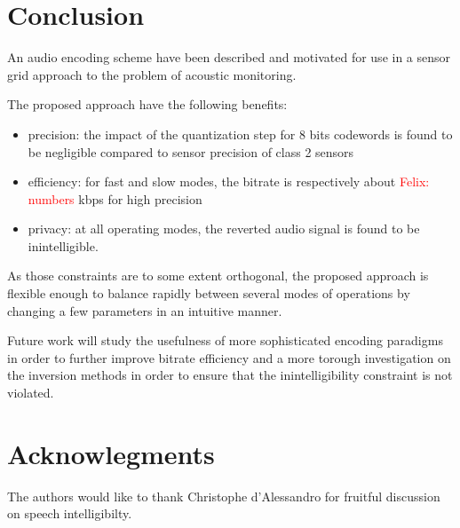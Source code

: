 \documentclass[final,3p,times,twocolumn]{elsarticle}
\newcommand{\fg}[1]{\textcolor{red}{ Felix: #1}}
\begin{document}
\section{Conclusion}

An audio encoding scheme have been described and motivated for use in a sensor grid approach to the problem of acoustic monitoring.

The proposed approach have the following benefits:
\begin{itemize}
	\item precision: the impact of the quantization step for 8 bits codewords is found to be negligible compared to sensor precision of class 2 sensors
	\item efficiency: for fast and slow modes, the bitrate is respectively about \fg{numbers} kbps for high precision
	\item privacy: at all operating modes, the reverted audio signal is found to be inintelligible.
\end{itemize}

As those constraints are to some extent orthogonal, the proposed approach is flexible enough to balance rapidly between several modes of operations by changing a few parameters in an intuitive manner.

Future work will study the usefulness of more sophisticated encoding paradigms in order to further improve bitrate efficiency and a more torough investigation on the inversion methods in order to ensure that the inintelligibility constraint is not violated.

\section{Acknowlegments}

The authors would like to thank Christophe d'Alessandro for fruitful discussion on speech intelligibilty.

\clearpage


\end{document}
